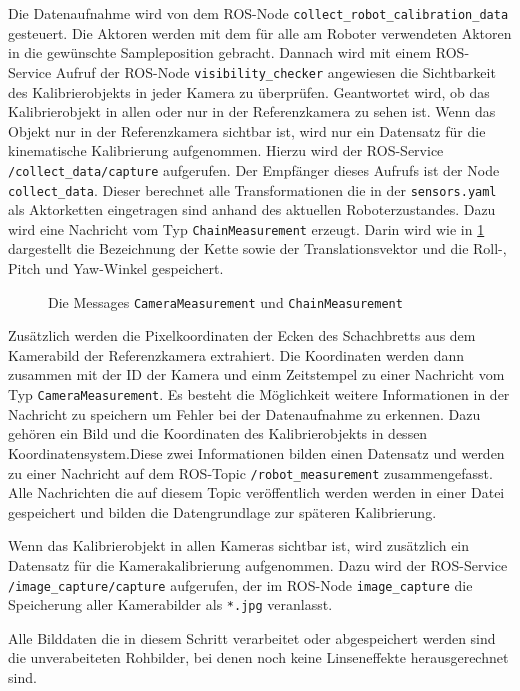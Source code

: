 Die Datenaufnahme wird von dem \ac{ROS}-Node \texttt{collect\_robot\_\allowbreak calibration\_\allowbreak data}
gesteuert. Die Aktoren werden mit dem für alle am Roboter verwendeten Aktoren in
die gewünschte Sampleposition gebracht. Dannach wird mit einem \ac{ROS}-Service
Aufruf der \ac{ROS}-Node \texttt{visibility\_checker} angewiesen die Sichtbarkeit
des Kalibrierobjekts in jeder Kamera zu überprüfen. Geantwortet wird, ob das 
Kalibrierobjekt in allen oder nur in der Referenzkamera zu sehen ist. 
Wenn das Objekt nur in der Referenzkamera sichtbar ist, wird nur ein Datensatz
für die kinematische Kalibrierung aufgenommen. Hierzu wird der \ac{ROS}-Service
\texttt{/collect\_data/capture} aufgerufen. Der Empfänger dieses Aufrufs ist 
der Node \texttt{collect\_data}. Dieser berechnet alle Transformationen die in 
der \texttt{sensors.yaml} als Aktorketten eingetragen sind anhand des aktuellen
Roboterzustandes. Dazu wird eine Nachricht vom Typ \texttt{ChainMeasurement}
erzeugt. Darin wird wie in \ref{fig:messages} dargestellt die Bezeichnung der 
Kette sowie der Translationsvektor und die Roll-, Pitch und Yaw-Winkel 
gespeichert.
\begin{figure}[htpb]
  \centering
  
  \caption{Die Messages \texttt{CameraMeasurement} und \texttt{ChainMeasurement}}
  \label{fig:messages}
\end{figure}
Zusätzlich werden die Pixelkoordinaten der Ecken des Schachbretts
aus dem Kamerabild der Referenzkamera extrahiert. Die Koordinaten werden dann 
zusammen mit der ID der Kamera und einm Zeitstempel zu einer Nachricht vom Typ 
\texttt{CameraMeasurement}. Es besteht die Möglichkeit weitere Informationen
in der Nachricht zu speichern um Fehler bei der Datenaufnahme zu erkennen.
Dazu gehören ein Bild und die Koordinaten des 
Kalibrierobjekts in dessen Koordinatensystem.Diese zwei Informationen 
bilden einen Datensatz und werden zu einer Nachricht auf dem \ac{ROS}-Topic
\texttt{/robot\_measurement} zusammengefasst. Alle Nachrichten die auf diesem 
Topic veröffentlich werden werden in einer Datei gespeichert und bilden die
Datengrundlage zur späteren Kalibrierung.

Wenn das Kalibrierobjekt in allen Kameras sichtbar ist, wird zusätzlich ein 
Datensatz für die Kamerakalibrierung aufgenommen. Dazu wird der \ac{ROS}-Service
\texttt{/image\_capture/capture} aufgerufen, der im \ac{ROS}-Node \texttt{image\_capture}
die Speicherung aller Kamerabilder als \texttt{*.jpg} veranlasst.

Alle Bilddaten die in diesem Schritt verarbeitet oder abgespeichert werden sind
die unverabeiteten Rohbilder, bei denen noch keine Linseneffekte herausgerechnet
sind.

